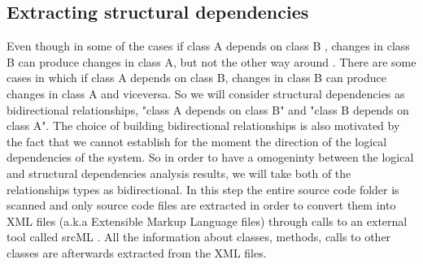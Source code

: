 \documentclass[conference,compsoc]{IEEEtran}
\begin{document}
\subsection{ Extracting structural dependencies}
Even though in some of the cases if class A depends on class B , changes in class B can produce changes in class A, but not the other way around \cite{ct5} . There are some cases in which if class A depends on class B,  changes in class B can produce changes in class A and viceversa. So we will consider structural dependencies as bidirectional relationships, "class A depends on class B" and "class B depends on class A". The choice of building bidirectional relationships is also motivated by the fact that we cannot establish for the moment the direction of the logical dependencies of the system. So in order to have a omogeninty between the logical and structural dependencies analysis results, we will take both of the relationships types as bidirectional.
In this step the entire source code folder is scanned and only source code files are extracted in order to convert them into XML files (a.k.a  Extensible Markup Language files) through calls to an external tool called srcML \cite{ct9}. All the information about classes, methods, calls to other classes are afterwards extracted from the XML files.
\end{document}
